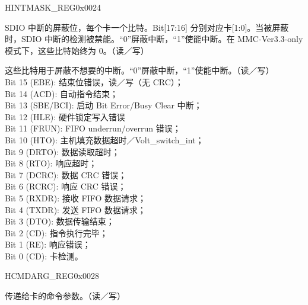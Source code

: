 \begin{register}{H}{INTMASK\_REG}{0x0024}\label{regdesc:INTMASKREG}
%
%
%
\regnewline%
\begin{regdesc}\begin{reglist}
\item [SDIO\_INT\_MASK]SDIO 中断的屏蔽位，每个卡一个比特。Bit[17:16] 分别对应卡[1:0]。当被屏蔽时，SDIO 中断的检测被禁能。“0”屏蔽中断，“1”使能中断。在 MMC-Ver3.3-only 模式下，这些比特始终为 0。（读／写）
\item [INT\_MASK]这些比特用于屏蔽不想要的中断。“0”屏蔽中断，“1”使能中断。（读／写）\\
Bit 15 (EBE): 结束位错误，读／写（无 CRC）；\\
Bit 14 (ACD): 自动指令结束；\\
Bit 13 (SBE/BCI): 启动 Bit Error/Busy Clear 中断；\\
Bit 12 (HLE): 硬件锁定写入错误\\
Bit 11 (FRUN): FIFO underrun/overrun 错误；\\
Bit 10 (HTO): 主机填充数据超时／Volt\_switch\_int；\\
Bit 9 (DRTO): 数据读取超时；\\
Bit 8 (RTO): 响应超时； \\
Bit 7 (DCRC): 数据 CRC 错误； \\
Bit 6 (RCRC): 响应 CRC 错误； \\
Bit 5 (RXDR): 接收 FIFO 数据请求； \\
Bit 4 (TXDR): 发送 FIFO 数据请求； \\
Bit 3 (DTO): 数据传输结束； \\
Bit 2 (CD): 指令执行完毕； \\
Bit 1 (RE): 响应错误；\\
Bit 0 (CD): 卡检测。
\end{reglist}\end{regdesc}
\end{register}


\begin{register}{H}{CMDARG\_REG}{0x0028}\label{regdesc:CMDARGREG}
%
\regnewline%
\begin{regdesc}\begin{reglist}
\item [CMDARG\_REG]传递给卡的命令参数。（读／写）
\end{reglist}\end{regdesc}
\end{register}


